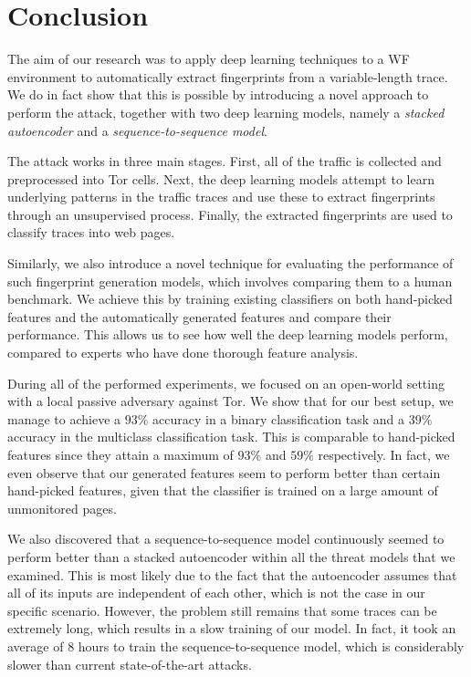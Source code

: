 \chapter{Conclusion}

The aim of our research was to apply deep learning techniques to a WF environment to automatically extract fingerprints from a variable-length trace.
We do in fact show that this is possible by introducing a novel approach to perform the attack, together with two deep learning models, namely a \textit{stacked autoencoder} and a \textit{sequence-to-sequence model}.

The attack works in three main stages.
First, all of the traffic is collected and preprocessed into Tor cells.
Next, the deep learning models attempt to learn underlying patterns in the traffic traces and use these to extract fingerprints through an unsupervised process.
Finally, the extracted fingerprints are used to classify traces into web pages.

Similarly, we also introduce a novel technique for evaluating the performance of such fingerprint generation models, which involves comparing them to a human benchmark.
We achieve this by training existing classifiers on both hand-picked features and the automatically generated features and compare their performance.
This allows us to see how well the deep learning models perform, compared to experts who have done thorough feature analysis.

During all of the performed experiments, we focused on an open-world setting with a local passive adversary against Tor.
We show that for our best setup, we manage to achieve a $93 \%$ accuracy in a binary classification task and a $39 \%$ accuracy in the multiclass classification task.
This is comparable to hand-picked features since they attain a maximum of $93 \%$ and $59 \%$ respectively.
In fact, we even observe that our generated features seem to perform better than certain hand-picked features, given that the classifier is trained on a large amount of unmonitored pages.

We also discovered that a sequence-to-sequence model continuously seemed to perform better than a stacked autoencoder within all the threat models that we examined.
This is most likely due to the fact that the autoencoder assumes that all of its inputs are independent of each other, which is not the case in our specific scenario.
However, the problem still remains that some traces can be extremely long, which results in a slow training of our model.
In fact, it took an average of $8$ hours to train the sequence-to-sequence model, which is considerably slower than current state-of-the-art attacks.

